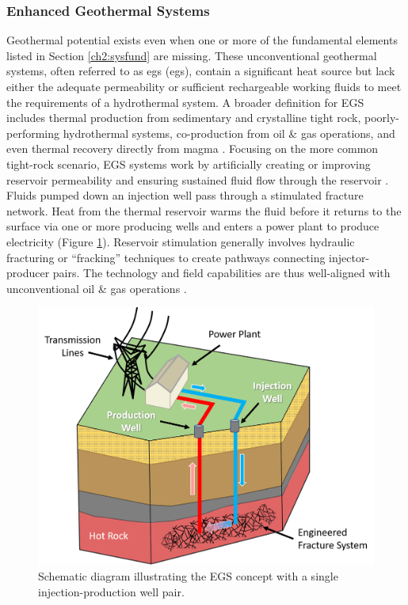 \subsubsection{Enhanced Geothermal Systems}\label{ch2:egs}
Geothermal potential exists even when one or more of the fundamental elements listed in Section \ref{ch2:sysfund} are missing. These unconventional geothermal systems, often referred to as \acrlong{egs} (\acrshort{egs}), contain a significant heat source but lack either the adequate permeability or sufficient rechargeable working fluids to meet the requirements of a hydrothermal system. A broader definition for EGS includes thermal production from sedimentary and crystalline tight rock, poorly-performing hydrothermal systems, co-production from oil \& gas operations, and even thermal recovery directly from magma \citep{tester_future_2006}. Focusing on the more common tight-rock scenario, EGS systems work by artificially creating or improving reservoir permeability and ensuring sustained fluid flow through the reservoir \citep[p.\ 281]{glassley_geothermal_2015}. Fluids pumped down an injection well pass through a stimulated fracture network. Heat from the thermal reservoir warms the fluid before it returns to the surface via one or more producing wells and enters a power plant to produce electricity (Figure \ref{fig:egs_schematic}). Reservoir stimulation generally involves hydraulic fracturing or ``fracking” techniques to create pathways connecting injector-producer pairs. The technology and field capabilities are thus well-aligned with unconventional oil \& gas operations \citep{petty_synergies_2009}. 

\begin{figure}%
\centering
\includegraphics[width=.85\textwidth]{templates/images/Figure-EGS_Schematic.png}
\caption[Enhanced Geothermal Systems schematic]{Schematic diagram illustrating the EGS concept with a single injection-production well pair.}
\label{fig:egs_schematic}
\end{figure}

